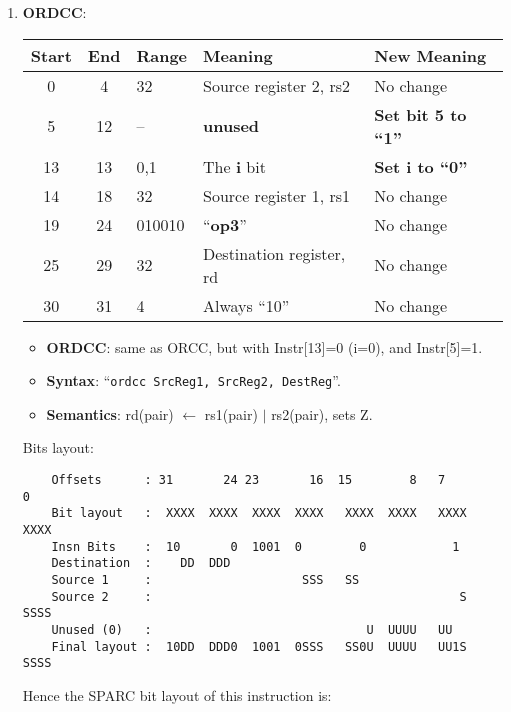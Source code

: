 \begin{enumerate}
\item \textbf{ORDCC}:\\
  \begin{center}
    \begin{tabular}[p]{|c|c|l|l|l|}
      \hline
      \textbf{Start} & \textbf{End} & \textbf{Range} & \textbf{Meaning} &
                                                                          \textbf{New Meaning}\\
      \hline
      0 & 4 & 32 & Source register 2, rs2 & No change \\
      5 & 12 & -- & \textbf{unused} & \textbf{Set bit 5 to ``1''} \\
      13 & 13 & 0,1 & The \textbf{i} bit & \textbf{Set i to ``0''} \\
      14 & 18 & 32 & Source register 1, rs1 & No change \\
      19 & 24 & 010010 & ``\textbf{op3}'' & No change \\
      25 & 29 & 32 & Destination register, rd & No change \\
      30 & 31 & 4 & Always ``10'' & No change \\
      \hline
    \end{tabular}
  \end{center}
  \begin{itemize}
  \item []\textbf{ORDCC}: same as ORCC, but with Instr[13]=0 (i=0), and
    Instr[5]=1.
  \item []\textbf{Syntax}: ``\texttt{ordcc  SrcReg1, SrcReg2, DestReg}''.
  \item []\textbf{Semantics}: rd(pair) $\leftarrow$ rs1(pair) $\vert$
    rs2(pair), sets Z.
  \end{itemize}
  Bits layout:
\begin{verbatim}
    Offsets      : 31       24 23       16  15        8   7        0
    Bit layout   :  XXXX  XXXX  XXXX  XXXX   XXXX  XXXX   XXXX  XXXX
    Insn Bits    :  10       0  1001  0        0            1       
    Destination  :    DD  DDD                                       
    Source 1     :                     SSS   SS
    Source 2     :                                           S  SSSS
    Unused (0)   :                              U  UUUU   UU        
    Final layout :  10DD  DDD0  1001  0SSS   SS0U  UUUU   UU1S  SSSS
\end{verbatim}

  Hence the SPARC bit layout of this instruction is:


\end{enumerate}
